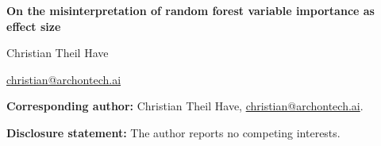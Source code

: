\documentclass[12pt]{article}
\begin{document}
\vspace*{2cm}
\begin{center}
  {\LARGE\bf On the misinterpretation of random forest variable importance as effect size}

  \vspace{2cm}

  {\large Christian Theil Have}

  \medskip
  \href{mailto:christian@archontech.ai}{christian@archontech.ai}
\end{center}

\vspace{2cm}
\noindent\textbf{Corresponding author:} Christian Theil Have,
\href{mailto:christian@archontech.ai}{christian@archontech.ai}.

\bigskip
\noindent\textbf{Disclosure statement:} The author reports no competing
interests.
\end{document}

